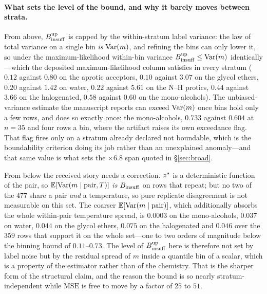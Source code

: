 \paragraph{What sets the level of the bound, and why it barely moves between strata.} From above,
$B_{\mathrm{insuff}}^{\mathrm{up}}$ is capped by the within-stratum label variance: the law of total variance on
a single bin \emph{is} $\mathrm{Var}(m)$, and refining the bins can only lower it, so under the
maximum-likelihood within-bin variance $B_{\mathrm{insuff}}^{\mathrm{up}}\le\mathrm{Var}(m)$ identically---which the
deposited maximum-likelihood column satisfies in every stratum ($0.12$ against $0.80$ on the
aprotic acceptors, $0.10$ against $3.07$ on the glycol ethers, $0.20$ against $1.42$ on water, $0.22$
against $5.61$ on the N--H protics, $0.44$ against $3.66$ on the halogenated, $0.58$ against $0.60$
on the mono-alcohols). The unbiased-variance estimate the manuscript reports can exceed $\mathrm{Var}(m)$
once bins hold only a few rows, and does so exactly once: the mono-alcohols, $0.733$ against $0.604$
at $n{=}35$ and four rows a bin, where the artifact raises its own exceedance flag. That
flag fires only on a stratum already declared not boundable, which is the boundability criterion
doing its job rather than an unexplained anomaly---and that same value is what sets the $\times6.8$
span quoted in \S\ref{sec:broad}.

From below the received story needs a correction. $z^\star$ is a deterministic function of the pair,
so $\mathbb{E}[\mathrm{Var}(m\mid\text{pair},T)]$ \emph{is} $B_{\mathrm{insuff}}$ on rows that repeat; but no two of the $477$
share a pair \emph{and} a temperature, so pure replicate disagreement is not measurable on this
set. The coarser $\mathbb{E}[\mathrm{Var}(m\mid\text{pair})]$, which additionally absorbs the whole within-pair
temperature spread, is $0.0003$ on the mono-alcohols, $0.037$ on water, $0.044$ on the glycol ethers,
$0.075$ on the halogenated and $0.046$ over the $359$ rows that support it on the whole set---one to
two orders of magnitude below the binning bound of $0.11$--$0.73$. The level of
$B_{\mathrm{insuff}}^{\mathrm{up}}$ here is therefore not set by label noise but by the residual spread of $m$
inside a quantile bin of a scalar, which is a property of the estimator rather than of the chemistry.
That is the sharper form of the structural claim, and the reason the bound is so nearly
stratum-independent while $\mathrm{MSE}$ is free to move by a factor of $25$ to $51$.

